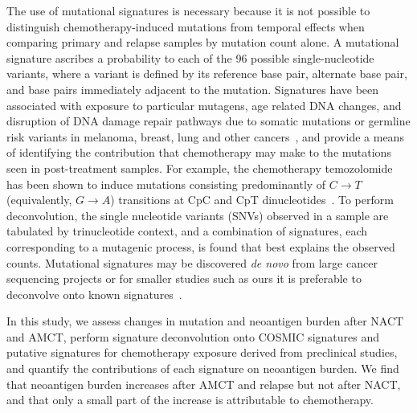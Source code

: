 The use of mutational signatures is necessary because it is not possible to distinguish chemotherapy-induced mutations from temporal effects when comparing primary and relapse samples by mutation count alone. A mutational signature ascribes a probability to each of the 96 possible single-nucleotide variants, where a variant is defined by its reference base pair, alternate base pair, and base pairs immediately adjacent to the mutation. Signatures have been associated with exposure to particular mutagens, age related DNA changes, and disruption of DNA damage repair pathways due to somatic mutations or germline risk variants in melanoma, breast, lung and other cancers~\cite{Alexandrov2013}, and provide a means of identifying the contribution that chemotherapy may make to the mutations seen in post-treatment samples. For example, the chemotherapy temozolomide has been shown to induce mutations consisting predominantly of $C \rightarrow T$ (equivalently, $G \rightarrow A$) transitions at CpC and CpT dinucleotides~\cite{Johnson_2013}. To perform deconvolution, the single nucleotide variants (SNVs) observed in a sample are tabulated by trinucleotide context, and a combination of signatures, each corresponding to a mutagenic process, is found that best explains the observed counts. Mutational signatures may be discovered \textit{de novo} from large cancer sequencing projects or  for smaller studies such as ours it is preferable to deconvolve onto known signatures~\cite{Rosenthal_2016}.

In this study, we assess changes in mutation and neoantigen burden after NACT and AMCT, perform signature deconvolution onto COSMIC signatures and putative signatures for chemotherapy exposure derived from preclinical studies, and quantify the contributions of each signature on neoantigen burden. We find that neoantigen burden increases after AMCT and relapse but not after NACT, and that only a small part of the increase is attributable to chemotherapy.

